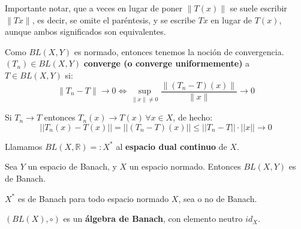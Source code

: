 \documentclass[12pt]{book}
\newcommand{\tbf}{\textbf}
\begin{document}
\begin{notacion}
    Importante notar, que a veces en lugar de poner $\|T(x)\|$ se suele escribir $\|Tx\|$, es decir, se omite el paréntesis, y se escribe $Tx$ en lugar de $T(x)$, aunque ambos significados son equivalentes.
\end{notacion}


\begin{definicion}
    Como $BL(X, Y)$ es normado, entonces tenemos la noción de convergencia. $(T_n) \in BL(X, Y)$ \tbf{converge (o converge uniformemente)} a $T \in BL(X, Y)$ si:
    \begin{equation*}
        \|T_n - T\| \to 0 \iff \sup_{\|x\|\neq 0} \dfrac{\|(T_n - T)(x)\|}{\|x\|} \to 0
    \end{equation*}
\end{definicion}

\begin{observacion}
    Si $T_n \to T$ entonces $T_n(x) \to T(x) \, \forall x \in X$, de hecho:
    \begin{equation*}
        ||T_n(x) - T(x)|| = ||(T_n - T)(x)|| \le ||T_n - T|| \cdot ||x|| \to 0
    \end{equation*} 
\end{observacion}



\begin{definicion}
    Llamamos $BL(X, \mathbb{R}) =: X^*$ al \textbf{espacio dual continuo} de $X$. \\
\end{definicion}

\begin{teo}
    Sea $Y$ un espacio de Banach, y $X$ un espacio normado. Entonces $BL(X, Y)$ es de Banach.
\end{teo}

\begin{coro}
    $X^*$ es de Banach para todo espacio normado $X$, sea o no de Banach.
\end{coro}

\begin{observacion}
    $(BL(X),\circ)$ es un \tbf{álgebra de Banach}, con elemento neutro $id_X$.
\end{observacion}
\end{document}
